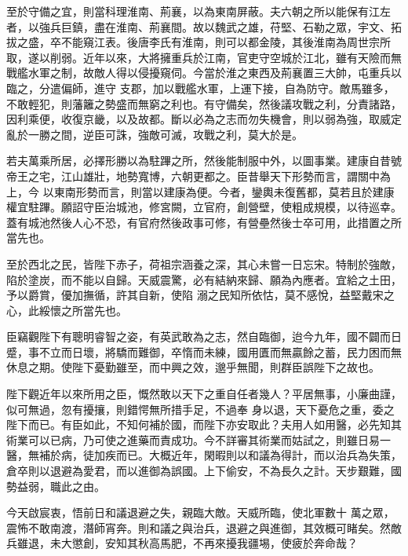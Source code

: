 \begin{pinyinscope}
 至於守備之宜，則當科理淮南、荊襄，以為東南屏蔽。夫六朝之所以能保有江左者，以強兵巨鎮，盡在淮南、荊襄間。故以魏武之雄，苻堅、石勒之眾，宇文、拓拔之盛，卒不能窺江表。後唐李氏有淮南，則可以都金陵，其後淮南為周世宗所取，遂以削弱。近年以來，大將擁重兵於江南，官吏守空城於江北，雖有天險而無戰艦水軍之制，故敵人得以侵擾窺伺。今當於淮之東西及荊襄置三大帥，屯重兵以臨之，分遣偏師，進守
 支郡，加以戰艦水軍，上運下接，自為防守。敵馬雖多，不敢輕犯，則藩籬之勢盛而無窮之利也。有守備矣，然後議攻戰之利，分責諸路，因利乘便，收復京畿，以及故都。斷以必為之志而勿失機會，則以弱為強，取威定亂於一勝之間，逆臣可誅，強敵可滅，攻戰之利，莫大於是。



 若夫萬乘所居，必擇形勝以為駐蹕之所，然後能制服中外，以圖事業。建康自昔號帝王之宅，江山雄壯，地勢寬博，六朝更都之。臣昔舉天下形勢而言，謂關中為上，今
 以東南形勢而言，則當以建康為便。今者，鑾輿未復舊都，莫若且於建康權宜駐蹕。願詔守臣治城池，修宮闕，立官府，創營壁，使粗成規模，以待巡幸。蓋有城池然後人心不恐，有官府然後政事可修，有營壘然後士卒可用，此措置之所當先也。



 至於西北之民，皆陛下赤子，荷祖宗涵養之深，其心未嘗一日忘宋。特制於強敵，陷於塗炭，而不能以自歸。天威震驚，必有結納來歸、願為內應者。宜給之土田，予以爵賞，優加撫循，許其自新，使陷
 溺之民知所依怙，莫不感悅，益堅戴宋之心，此綏懷之所當先也。



 臣竊觀陛下有聰明睿智之姿，有英武敢為之志，然自臨御，迨今九年，國不闢而日蹙，事不立而日壞，將驕而難御，卒惰而未練，國用匱而無贏餘之蓄，民力困而無休息之期。使陛下憂勤雖至，而中興之效，邈乎無聞，則群臣誤陛下之故也。



 陛下觀近年以來所用之臣，慨然敢以天下之重自任者幾人？平居無事，小廉曲謹，似可無過，忽有擾攘，則錯愕無所措手足，不過奉
 身以退，天下憂危之重，委之陛下而已。有臣如此，不知何補於國，而陛下亦安取此？夫用人如用醫，必先知其術業可以已病，乃可使之進藥而責成功。今不詳審其術業而姑試之，則雖日易一醫，無補於病，徒加疾而已。大概近年，閑暇則以和議為得計，而以治兵為失策，倉卒則以退避為愛君，而以進御為誤國。上下偷安，不為長久之計。天步艱難，國勢益弱，職此之由。



 今天啟宸衷，悟前日和議退避之失，親臨大敵。天威所臨，使北軍數十
 萬之眾，震怖不敢南渡，潛師宵奔。則和議之與治兵，退避之與進御，其效概可睹矣。然敵兵雖退，未大懲創，安知其秋高馬肥，不再來擾我疆埸，使疲於奔命哉？




\end{pinyinscope}
